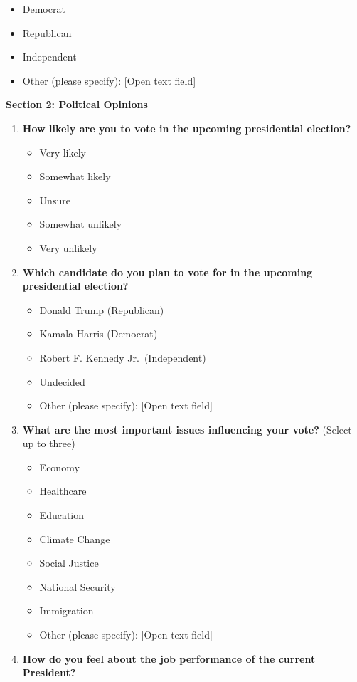 \documentclass[
  letterpaper,
  DIV=11,
  numbers=noendperiod]{scrartcl}
\begin{document}
\begin{enumerate}
  \begin{itemize}
  \item
    Democrat
  \item
    Republican
  \item
    Independent
  \item
    Other (please specify): {[}Open text field{]}
  \end{itemize}
\end{enumerate}

\textbf{Section 2: Political Opinions}

\begin{enumerate}
\def\labelenumi{\arabic{enumi}.}
\setcounter{enumi}{5}
\item
  \textbf{How likely are you to vote in the upcoming presidential
  election?}

  \begin{itemize}
  \item
    Very likely
  \item
    Somewhat likely
  \item
    Unsure
  \item
    Somewhat unlikely
  \item
    Very unlikely
  \end{itemize}
\item
  \textbf{Which candidate do you plan to vote for in the upcoming
  presidential election?}

  \begin{itemize}
  \item
    Donald Trump (Republican)
  \item
    Kamala Harris (Democrat)
  \item
    Robert F. Kennedy Jr.~(Independent)
  \item
    Undecided
  \item
    Other (please specify): {[}Open text field{]}
  \end{itemize}
\item
  \textbf{What are the most important issues influencing your vote?}
  (Select up to three)

  \begin{itemize}
  \item
    Economy
  \item
    Healthcare
  \item
    Education
  \item
    Climate Change
  \item
    Social Justice
  \item
    National Security
  \item
    Immigration
  \item
    Other (please specify): {[}Open text field{]}
  \end{itemize}
\item
  \textbf{How do you feel about the job performance of the current
  President?}


\end{enumerate}
\end{document}
